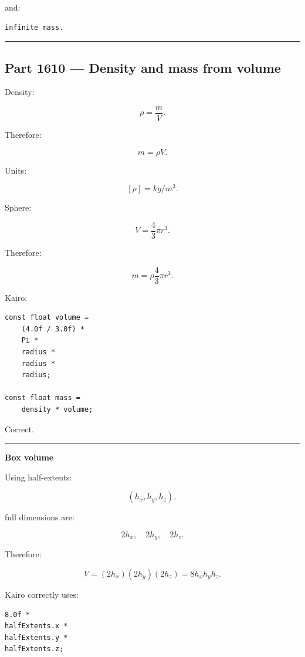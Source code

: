 and:

\begin{verbatim}
infinite mass.
\end{verbatim}

\begin{center}\rule{0.5\linewidth}{0.5pt}\end{center}

\subsection{Part 1610 --- Density and mass from volume}\label{06-engine-ii-ch034-part-1610-density-and-mass-from-volume}

\hypertarget{06-engine-ii-ch034-part-1610-density-and-mass-from-volume}{}

Density:

\[
\rho
=
\frac{m}{V}.
\]

Therefore:

\[
\boxed{
m=\rho V.
}
\]

Units:

\[
[\rho]
=
kg/m^3.
\]

Sphere:

\[
V=
\frac{4}{3}\pi r^3.
\]

Therefore:

\[
m=
\rho
\frac{4}{3}\pi r^3.
\]

Kairo:

\begin{verbatim}
const float volume =
    (4.0f / 3.0f) *
    Pi *
    radius *
    radius *
    radius;

const float mass =
    density * volume;
\end{verbatim}

Correct.

\begin{center}\rule{0.5\linewidth}{0.5pt}\end{center}

\textbf{Box volume}

Using half-extents:

\[
(h_x,h_y,h_z),
\]

full dimensions are:

\[
2h_x,\quad2h_y,\quad2h_z.
\]

Therefore:

\[
V=
(2h_x)(2h_y)(2h_z)
=
8h_xh_yh_z.
\]

Kairo correctly uses:

\begin{verbatim}
8.0f *
halfExtents.x *
halfExtents.y *
halfExtents.z;
\end{verbatim}

